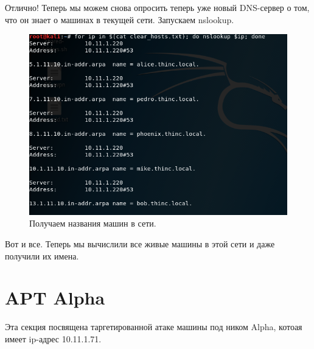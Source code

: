\documentclass[a4paper,12pt]{article}
\begin{document}
\newpage

Отлично! Теперь мы можем снова опросить теперь уже новый DNS-сервер о том, что он знает о машинах в текущей сети. Запускаем nslookup.

\begin{figure}[h!]
	\includegraphics[width=\linewidth]{succes_nslookup_8.png}
	\caption{Получаем названия машин в сети.}
	\label{fig:boat2}
\end{figure}
\newpage
Вот и все. Теперь мы вычислили все живые машины в этой сети и даже получили их имена.


\section{APT Alpha}
Эта секция посвящена таргетированной атаке машины под ником Alpha, котоая имеет ip-адрес 10.11.1.71.
\end{document}
